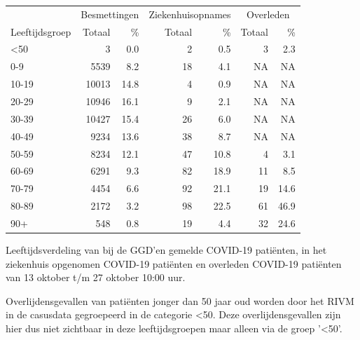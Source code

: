 \documentclass[
  english,
  man,floatsintext]{apa6}
\begin{document}
\begin{table}
\centering\begingroup\fontsize{11}{13}\selectfont

\begin{threeparttable}
\begin{tabular}{lrrrrrr}
\toprule
\multicolumn{1}{c}{ } & \multicolumn{2}{c}{Besmettingen} & \multicolumn{2}{c}{Ziekenhuisopnames} & \multicolumn{2}{c}{Overleden} \\
\cmidrule(l{3pt}r{3pt}){2-3} \cmidrule(l{3pt}r{3pt}){4-5} \cmidrule(l{3pt}r{3pt}){6-7}
Leeftijdsgroep & Totaal & \% & Totaal & \% & Totaal & \%\\
\midrule
<50 & 3 & 0.0 & 2 & 0.5 & 3 & 2.3\\
0-9 & 5539 & 8.2 & 18 & 4.1 & NA & NA\\
10-19 & 10013 & 14.8 & 4 & 0.9 & NA & NA\\
20-29 & 10946 & 16.1 & 9 & 2.1 & NA & NA\\
30-39 & 10427 & 15.4 & 26 & 6.0 & NA & NA\\
40-49 & 9234 & 13.6 & 38 & 8.7 & NA & NA\\
50-59 & 8234 & 12.1 & 47 & 10.8 & 4 & 3.1\\
60-69 & 6291 & 9.3 & 82 & 18.9 & 11 & 8.5\\
70-79 & 4454 & 6.6 & 92 & 21.1 & 19 & 14.6\\
80-89 & 2172 & 3.2 & 98 & 22.5 & 61 & 46.9\\
90+ & 548 & 0.8 & 19 & 4.4 & 32 & 24.6\\
\bottomrule
\end{tabular}
\begin{tablenotes}
\item[1] Leeftijdsverdeling van bij de GGD’en gemelde COVID-19 patiënten, in het ziekenhuis opgenomen COVID-19 patiënten en overleden COVID-19 patiënten van 13 oktober t/m 27 oktober 10:00 uur.
\item[2] Overlijdensgevallen van patiënten jonger dan 50 jaar oud worden door het RIVM in de casusdata gegroepeerd in de categorie <50. Deze overlijdensgevallen zijn hier dus niet zichtbaar in deze leeftijdsgroepen maar alleen via de groep '<50'.
\end{tablenotes}
\end{threeparttable}
\endgroup{}
\end{table}

\newpage
\end{document}

